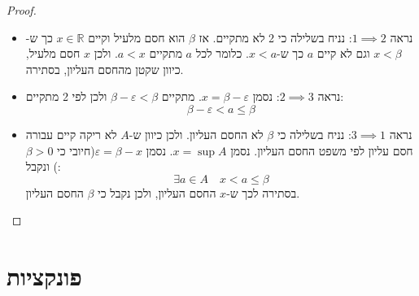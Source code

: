 \documentclass{tstextbook}
\begin{document}
\begin{proof}
  \begin{itemize}
    \item נראה \(1\implies 2\):
נניח בשלילה כי 2 לא מתקיים. אז \(\beta\) הוא חסם מלעיל וקיים \(x \in \mathbb{R}\) כך ש-\(x<\beta\) וגם לא קיים \(a\) כך ש-\(x<a\). כלומר לכל \(a\) מתקיים \(a<x\). ולכן \(x\) חסם מלעיל, כיוון שקטן מהחסם העליון, בסתירה.
    \item נראה \(2\implies 3\):
נסמן \(x=\beta-\varepsilon\). מתקיים \(\beta-\varepsilon<\beta\) ולכן לפי 2 מתקיים:
$$\beta-\varepsilon<a\leq \beta$$
    \item נראה \(3\implies 1\):
נניח בשלילה כי \(\beta\) לא החסם העליון. ולכן כיוון ש-\(A\) לא ריקה קיים עבורה חסם עליון לפי משפט החסם העליון. נסמן \(x = \sup A\). נסמן \(\varepsilon=\beta-x\)(חיובי כי \(\beta>0\)) ונקבל:
$$\exists a \in A\quad x<a\leq \beta$$
בסתירה לכך ש-\(x\) החסם העליון, ולכן נקבל כי \(\beta\) החסם העליון.
  \end{itemize}
\end{proof}
\section{פונקציות}
\end{document}
